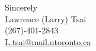 \documentclass[11pt,a4]{article}
\begin{document}

\vspace{0.5cm}
\raggedright
Sincerely \\ Lawrence (Larry) Tsai \\ (267)-401-2843 \\ \href{mailto:L.tsai@mail.utoronto.ca}{L.tsai@mail.utoronto.ca}
\end{document}
